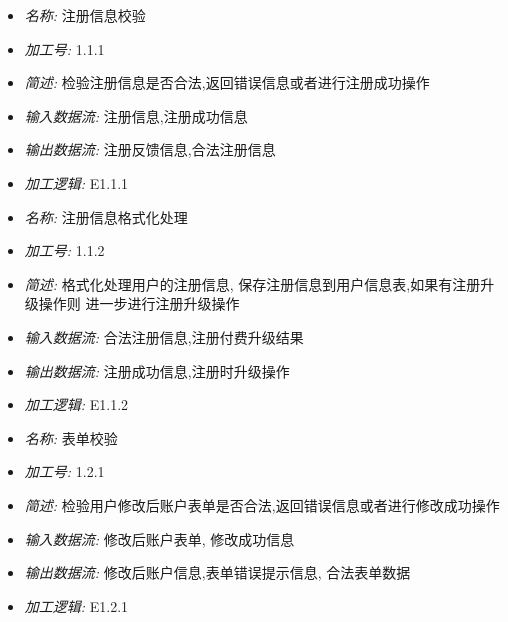 \documentclass{article}
\begin{document}
\begin{CJK*}{UTF8}{gbsn}
\begin{itemize}
\end{itemize}


\vspace{-1mm}


\begin{itemize}
\item \textit{名称: } 注册信息校验
\item \textit{加工号: } 1.1.1
\item \textit{简述: } 检验注册信息是否合法,返回错误信息或者进行注册成功操作 
\item \textit{输入数据流: } 注册信息,注册成功信息
\item \textit{输出数据流: } 注册反馈信息,合法注册信息
\item \textit{加工逻辑: } E1.1.1

\end{itemize}


\vspace{-1mm}


\begin{itemize}
\item \textit{名称: } 注册信息格式化处理
\item \textit{加工号: } 1.1.2
\item \textit{简述: } 格式化处理用户的注册信息, 保存注册信息到用户信息表,如果有注册升级操作则 进一步进行注册升级操作
\item \textit{输入数据流: } 合法注册信息,注册付费升级结果
\item \textit{输出数据流: } 注册成功信息,注册时升级操作
\item \textit{加工逻辑: } E1.1.2

\end{itemize}


\vspace{-1mm}


\begin{itemize}
\item \textit{名称: } 表单校验
\item \textit{加工号: } 1.2.1
\item \textit{简述: } 检验用户修改后账户表单是否合法,返回错误信息或者进行修改成功操作 
\item \textit{输入数据流: } 修改后账户表单, 修改成功信息
\item \textit{输出数据流: } 修改后账户信息,表单错误提示信息, 合法表单数据
\item \textit{加工逻辑: } E1.2.1

\end{itemize}



\end{CJK*}
\end{document}
